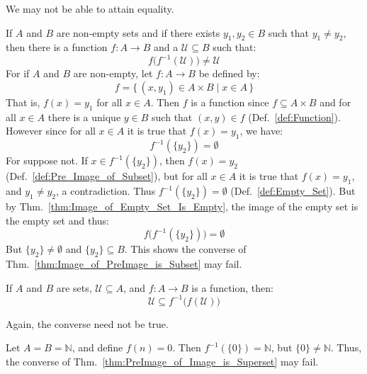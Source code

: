     We may not be able to attain equality.
    \begin{example}
        If $A$ and $B$ are non-empty sets and if there exists
        $y_{1},y_{2}\in{B}$ such that $y_{1}\ne{y}_{2}$, then
        there is a function $f:A\rightarrow{B}$ and a
        $\mathcal{U}\subseteq{B}$ such that:
        \begin{equation}
            f\big(f^{-1}(\mathcal{U})\big)\ne\mathcal{U}
        \end{equation}
        For if $A$ and $B$ are non-empty, let $f:A\rightarrow{B}$ be defined by:
        \begin{equation}
            f=\{\,(x,y_{1})\in{A}\times{B}\;|\;x\in{A}\,\}
        \end{equation}
        That is, $f(x)=y_{1}$ for all $x\in{A}$. Then $f$ is a function since
        $f\subseteq{A}\times{B}$ and for all $x\in{A}$ there is a unique
        $y\in{B}$ such that $(x,y)\in{f}$ (Def.~\ref{def:Function}). However
        since for all $x\in{A}$ it is true that $f(x)=y_{1}$, we have:
        \begin{equation}
            f^{\minus{1}}(\{y_{2}\})=\emptyset
        \end{equation}
        For suppose not. If $x\in{f}^{-1}(\{y_{2}\})$, then $f(x)=y_{2}$
        (Def.~\ref{def:Pre_Image_of_Subset}), but for all $x\in{A}$ it is
        true that $f(x)=y_{1}$, and $y_{1}\ne{y}_{2}$, a contradiction. Thus
        $f^{\minus{1}}(\{y_{2}\})=\emptyset$ (Def.~\ref{def:Empty_Set}). But by
        Thm.~\ref{thm:Image_of_Empty_Set_Is_Empty}, the image of the
        empty set is the empty set and thus:
        \begin{equation}
            f\big(f^{-1}(\{y_{2}\})\big)=\emptyset
        \end{equation}
        But $\{y_{2}\}\ne\emptyset$ and $\{y_{2}\}\subseteq{B}$. This shows
        the converse of Thm.~\ref{thm:Image_of_PreImage_is_Subset} may fail.
    \end{example}
    \begin{theorem}
        \label{thm:PreImage_of_Image_is_Superset}%
        If $A$ and $B$ are sets, $\mathcal{U}\subseteq{A}$, and
        $f:A\rightarrow{B}$ is a function, then:
        \begin{equation*}
            \mathcal{U}\subseteq{f}^{\minus{1}}\big(f(\mathcal{U})\big)
        \end{equation*}
    \end{theorem}
    Again, the converse need not be true.
    \begin{example}
        Let $A=B=\mathbb{N}$, and define $f(n)=0$. Then
        $f^{\minus{1}}(\{0\})=\mathbb{N}$, but $\{0\}\ne\mathbb{N}$. Thus, the
        converse of Thm.~\ref{thm:PreImage_of_Image_is_Superset} may fail.
    \end{example}

